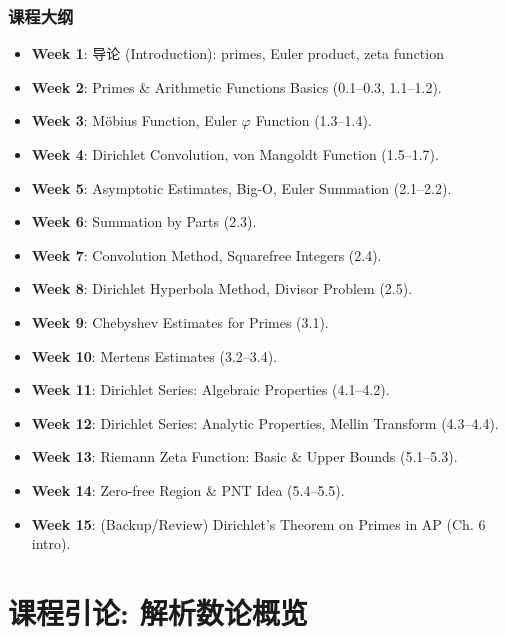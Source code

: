 \begin{frame}
\frametitle{课程大纲}

\begin{itemize}
\item \textbf{Week 1}: 导论 (Introduction): primes, Euler product, zeta function
\item \textbf{Week 2}: Primes \& Arithmetic Functions Basics (0.1--0.3, 1.1--1.2).
\item \textbf{Week 3}: Möbius Function, Euler $\varphi$ Function (1.3--1.4).
\item \textbf{Week 4}: Dirichlet Convolution, von Mangoldt Function (1.5--1.7).
\item \textbf{Week 5}: Asymptotic Estimates, Big-O, Euler Summation (2.1--2.2).
\item \textbf{Week 6}: Summation by Parts (2.3).
\item \textbf{Week 7}: Convolution Method, Squarefree Integers (2.4).
\item \textbf{Week 8}: Dirichlet Hyperbola Method, Divisor Problem (2.5).
\item \textbf{Week 9}: Chebyshev Estimates for Primes (3.1).
\item \textbf{Week 10}: Mertens Estimates (3.2--3.4).
\item \textbf{Week 11}: Dirichlet Series: Algebraic Properties (4.1--4.2).
\item \textbf{Week 12}: Dirichlet Series: Analytic Properties, Mellin Transform (4.3--4.4).
\item \textbf{Week 13}: Riemann Zeta Function: Basic \& Upper Bounds (5.1--5.3).
\item \textbf{Week 14}: Zero-free Region \& PNT Idea (5.4--5.5).
\item \textbf{Week 15}: (Backup/Review) Dirichlet's Theorem on Primes in AP (Ch. 6 intro).
\end{itemize}

\end{frame}


\section{课程引论: 解析数论概览}

